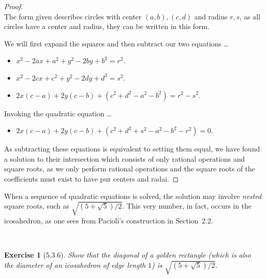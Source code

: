 \documentclass[12pt]{article}
\newcommand{\XB}{\color{black}}
\newcommand{\XBB}{\color{blue}}
\newcommand{\ds}{\displaystyle}
\theoremstyle{plain}
\newtheorem{ex}{Exercise}
\begin{document}
\begin{proof}
  \ \\

  The form given describes circles with center $ (a, b), (c, d) $ and radius $ r, s $, as all circles have a center and radius, they can be written in this form.

  We will first expand the squares and then subtract our two equations \dots

  \begin{itemize}
    \item $ \ds x^{2} - 2ax + a^{2} + y^{2} - 2by + b^{2} = r^{2} $.
    \item $ \ds x^{2} - 2cx + c^{2} + y^{2} - 2dy + d^{2} = s^{2} $.
    \item $ \ds 2x(c - a) + 2y(c - b) + (c^{2} + d^{2} - a^{2} - b^{2}) = r^{2} - s^{2} $.
  \end{itemize}

  Invoking the quadratic equation \dots

  \begin{itemize}
    \item $ \ds 2x(c - a) + 2y(c - b) + (c^{2} + d^{2} + s^{2} - a^{2} - b^{2} - r^{2}) = 0 $.
  \end{itemize}

  As subtracting these equations is equivalent to setting them equal, we have found a solution to their intersection which consists of only rational operations and square roots, 
  as we only perform rational operations and the square roots of the coefficients must exist to have pur centers and radai. 

\end{proof}

\newpage

When a sequence of quadratic equations is solved, the solution may involve \emph{nested} square roots, such as $ \sqrt{(5 + \sqrt{5}) / 2} $. This very number, in fact, occurs in the icosahedron, as one sees from Pacioli's construction in Section~2.2.

\XBB\hrulefill\XB \\
\begin{ex} [5.3.6]
  Show that the diagonal of a golden rectangle (which is also the diameter of an icosahedron of edge length $ 1 $) is $ \sqrt{(5 + \sqrt{5}) / 2} $.
\end{ex}
\XBB\hrulefill\XB \\
\end{document}
